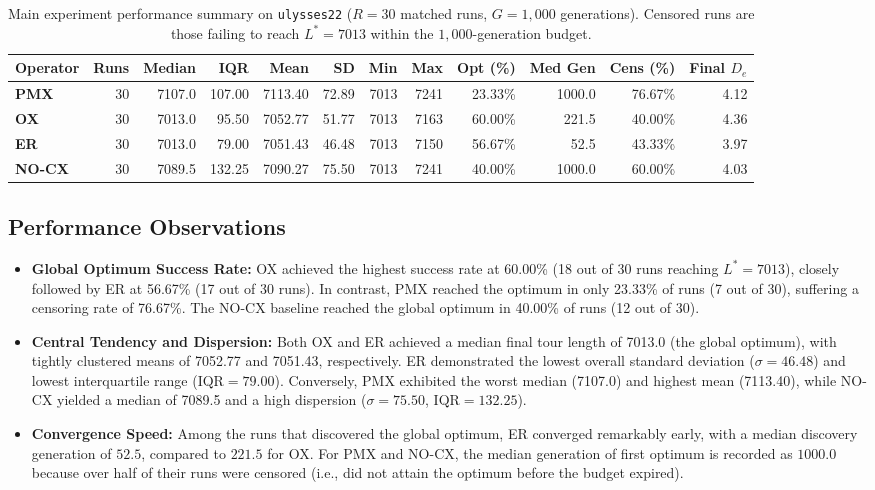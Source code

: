 \documentclass[10pt,a4paper]{article}
\begin{document}
\begin{table}[htbp]
\centering
\footnotesize
\setlength{\tabcolsep}{3.3pt}
\caption{Main experiment performance summary on \texttt{ulysses22} ($R=30$ matched runs, $G=1{,}000$ generations). Censored runs are those failing to reach $L^*=7013$ within the $1{,}000$-generation budget.}
\label{tab:main_summary}
\begin{tabular}{lrrrrrrrrrrr}
\toprule
\textbf{Operator} & \textbf{Runs} & \textbf{Median} & \textbf{IQR} & \textbf{Mean} & \textbf{SD} & \textbf{Min} & \textbf{Max} & \textbf{Opt (\%)} & \textbf{Med Gen} & \textbf{Cens (\%)} & \textbf{Final $D_e$} \\
\midrule
\textbf{PMX}   & 30 & 7107.0 & 107.00 & 7113.40 & 72.89 & 7013 & 7241 & 23.33\% & 1000.0 & 76.67\% & 4.12 \\
\textbf{OX}    & 30 & 7013.0 &  95.50 & 7052.77 & 51.77 & 7013 & 7163 & 60.00\% &  221.5 & 40.00\% & 4.36 \\
\textbf{ER}    & 30 & 7013.0 &  79.00 & 7051.43 & 46.48 & 7013 & 7150 & 56.67\% &   52.5 & 43.33\% & 3.97 \\
\textbf{NO-CX} & 30 & 7089.5 & 132.25 & 7090.27 & 75.50 & 7013 & 7241 & 40.00\% & 1000.0 & 60.00\% & 4.03 \\
\bottomrule
\end{tabular}
\end{table}

\subsection{Performance Observations}

\begin{itemize}
    \item \textbf{Global Optimum Success Rate:} OX achieved the highest success rate at 60.00\% (18 out of 30 runs reaching $L^* = 7013$), closely followed by ER at 56.67\% (17 out of 30 runs). In contrast, PMX reached the optimum in only 23.33\% of runs (7 out of 30), suffering a censoring rate of 76.67\%. The NO-CX baseline reached the global optimum in 40.00\% of runs (12 out of 30).
    \item \textbf{Central Tendency and Dispersion:} Both OX and ER achieved a median final tour length of 7013.0 (the global optimum), with tightly clustered means of 7052.77 and 7051.43, respectively. ER demonstrated the lowest overall standard deviation ($\sigma = 46.48$) and lowest interquartile range ($\text{IQR} = 79.00$). Conversely, PMX exhibited the worst median (7107.0) and highest mean (7113.40), while NO-CX yielded a median of 7089.5 and a high dispersion ($\sigma = 75.50$, $\text{IQR} = 132.25$).
    \item \textbf{Convergence Speed:} Among the runs that discovered the global optimum, ER converged remarkably early, with a median discovery generation of $52.5$, compared to $221.5$ for OX. For PMX and NO-CX, the median generation of first optimum is recorded as $1000.0$ because over half of their runs were censored (i.e., did not attain the optimum before the budget expired).
\end{itemize}
\end{document}
